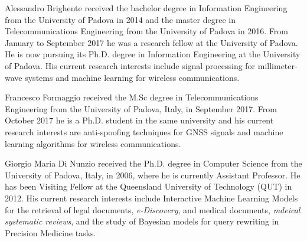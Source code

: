 \documentclass[draftcls,journal,onecolumn]{IEEEtran}
\begin{document}
\printbibliography
\begin{IEEEbiography}
%
{Alessandro Brighente} received the bachelor degree in Information Engineering from the University of Padova in 2014 and the master degree in Telecommunications Engineering from the University of Padova in 2016. From January to September 2017 he was a research fellow at the University of Padova. He is now pursuing its Ph.D. degree in Information Engineering at the University of Padova. His current research interests include signal processing for millimeter-wave systems and machine learning for wireless communications.
\end{IEEEbiography}
\begin{IEEEbiography}
%
{Francesco Formaggio} received the M.Sc degree in Telecommunications Engineering from the University of Padova, Italy, in September 2017. From October 2017 he is a Ph.D. student in the same university and his current research interests are anti-spoofing techniques for GNSS signals and machine learning algorithms for wireless communications.
\end{IEEEbiography}
\begin{IEEEbiography}%
{Giorgio Maria Di Nunzio} received the Ph.D. degree in Computer Science from the University of Padova, Italy, in 2006, where he is currently Assistant Professor. He has been Visiting Fellow at the Queensland University of Technology (QUT) in 2012. His current research interests include Interactive Machine Learning Models for the retrieval of legal documents, \emph{e-Discovery}, and medical documents, \emph{mdeical systematic reviews}, and the study of Bayesian models for query rewriting in Precision Medicine tasks.
\end{IEEEbiography}
\end{document}
